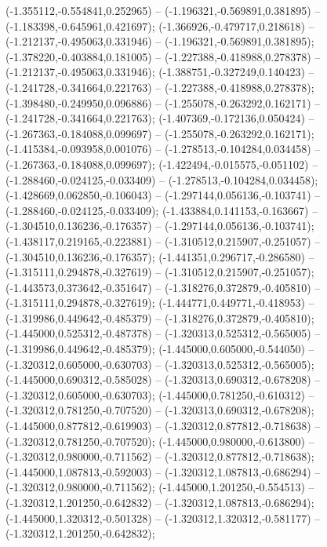  (-1.355112,-0.554841,0.252965) -- (-1.196321,-0.569891,0.381895) -- (-1.183398,-0.645961,0.421697);
 (-1.366926,-0.479717,0.218618) -- (-1.212137,-0.495063,0.331946) -- (-1.196321,-0.569891,0.381895);
 (-1.378220,-0.403884,0.181005) -- (-1.227388,-0.418988,0.278378) -- (-1.212137,-0.495063,0.331946);
 (-1.388751,-0.327249,0.140423) -- (-1.241728,-0.341664,0.221763) -- (-1.227388,-0.418988,0.278378);
 (-1.398480,-0.249950,0.096886) -- (-1.255078,-0.263292,0.162171) -- (-1.241728,-0.341664,0.221763);
 (-1.407369,-0.172136,0.050424) -- (-1.267363,-0.184088,0.099697) -- (-1.255078,-0.263292,0.162171);
 (-1.415384,-0.093958,0.001076) -- (-1.278513,-0.104284,0.034458) -- (-1.267363,-0.184088,0.099697);
 (-1.422494,-0.015575,-0.051102) -- (-1.288460,-0.024125,-0.033409) -- (-1.278513,-0.104284,0.034458);
 (-1.428669,0.062850,-0.106043) -- (-1.297144,0.056136,-0.103741) -- (-1.288460,-0.024125,-0.033409);
 (-1.433884,0.141153,-0.163667) -- (-1.304510,0.136236,-0.176357) -- (-1.297144,0.056136,-0.103741);
 (-1.438117,0.219165,-0.223881) -- (-1.310512,0.215907,-0.251057) -- (-1.304510,0.136236,-0.176357);
 (-1.441351,0.296717,-0.286580) -- (-1.315111,0.294878,-0.327619) -- (-1.310512,0.215907,-0.251057);
 (-1.443573,0.373642,-0.351647) -- (-1.318276,0.372879,-0.405810) -- (-1.315111,0.294878,-0.327619);
 (-1.444771,0.449771,-0.418953) -- (-1.319986,0.449642,-0.485379) -- (-1.318276,0.372879,-0.405810);
 (-1.445000,0.525312,-0.487378) -- (-1.320313,0.525312,-0.565005) -- (-1.319986,0.449642,-0.485379);
 (-1.445000,0.605000,-0.544050) -- (-1.320312,0.605000,-0.630703) -- (-1.320313,0.525312,-0.565005);
 (-1.445000,0.690312,-0.585028) -- (-1.320313,0.690312,-0.678208) -- (-1.320312,0.605000,-0.630703);
 (-1.445000,0.781250,-0.610312) -- (-1.320312,0.781250,-0.707520) -- (-1.320313,0.690312,-0.678208);
 (-1.445000,0.877812,-0.619903) -- (-1.320312,0.877812,-0.718638) -- (-1.320312,0.781250,-0.707520);
 (-1.445000,0.980000,-0.613800) -- (-1.320312,0.980000,-0.711562) -- (-1.320312,0.877812,-0.718638);
 (-1.445000,1.087813,-0.592003) -- (-1.320312,1.087813,-0.686294) -- (-1.320312,0.980000,-0.711562);
 (-1.445000,1.201250,-0.554513) -- (-1.320312,1.201250,-0.642832) -- (-1.320312,1.087813,-0.686294);
 (-1.445000,1.320312,-0.501328) -- (-1.320312,1.320312,-0.581177) -- (-1.320312,1.201250,-0.642832);
